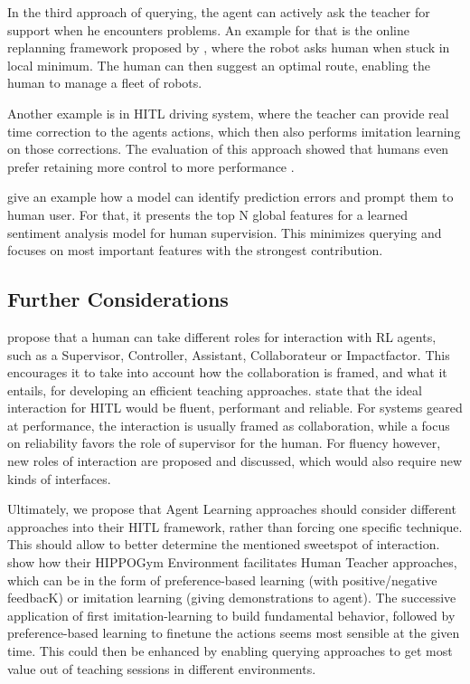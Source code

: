 \documentclass[twoside,11pt]{article}
\begin{document}
In the third approach of querying, the agent can actively ask the teacher for support when he encounters problems.
An example for that is the online replanning framework proposed by \cite{PapallasEtAl:2020:OnlineReplanningTrajectories}, where the robot asks human when stuck in local minimum. The human can then suggest an optimal route, enabling the human to manage a fleet of robots.

Another example is in HITL driving system, where the teacher can provide real time correction to the agents actions, which then also performs imitation learning on those corrections. The evaluation of this approach showed that humans even prefer retaining more control to more performance \cite{WuEtAl:2021:HITLDRLAutonomousDriving}.

\cite{LiuGuoMahmud:2021:HITLErrorDetectionFramework} give an example how a model can identify prediction errors and prompt them to human user. For that, it presents the top N global features for a learned sentiment analysis model for human supervision. This minimizes querying and focuses on most important features with the strongest contribution.

\subsection{Further Considerations}

\citet{WuEtAl:2021:HITLMLSurvey} propose that a human can take different roles for interaction with RL agents, such as a Supervisor, Controller, Assistant, Collaborateur or Impactfactor. This encourages it to take into account how the collaboration is framed, and what it entails, for developing an efficient teaching approaches.
\citet{WuEtAl:2021:HITLMLSurvey} state that the ideal interaction for HITL would be fluent, performant and reliable. For systems geared at performance, the interaction is usually framed as collaboration, while a focus on reliability favors the role of supervisor for the human. For fluency however, new roles of interaction are proposed and discussed, which would also require new kinds of interfaces.

Ultimately, we propose that Agent Learning approaches should consider different approaches into their HITL framework, rather than forcing one specific technique. This should allow to better determine the mentioned sweetspot of interaction. \citep{WuEtAl:2021:HITLMLSurvey} show how their HIPPOGym Environment facilitates Human Teacher approaches, which can be in the form of preference-based learning (with positive/negative feedbacK) or imitation learning (giving demonstrations to agent). The successive application of first imitation-learning to build fundamental behavior, followed by preference-based learning to finetune the actions seems most sensible at the given time. This could then be enhanced by enabling querying approaches to get most value out of teaching sessions in different environments.
\end{document}

